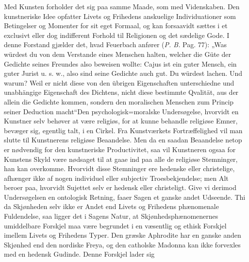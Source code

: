 \documentclass[12pt]{book}
\newcommand{\opage}[1]{\marginnote{\footnotesize\textit{[#1]}}}
\begin{document}
Med Kunsten forholder det sig paa samme Maade, som med Videnskaben. Den
kunstneriske Idee opfatter Livets og Frihedens anskuelige Individuationer som
Betingelser og Momenter for sit eget Formaal, og kan forsaavidt sættes i et
\opage{266} exclusivt eller dog indifferent Forhold til Religionen og det sædelige Gode. I denne
Forstand gjælder det, hvad Feuerbach anfører (\textit{P. B.} Pag. 77): „Was würdest
du von dem Verstande eines Menschen halten, welcher die Güte der Gedichte seines
Freundes also beweisen wollte: Cajus ist ein guter Mensch, ein guter Jurist u. s. w.,
also sind seine Gedichte auch gut. Du würdest lachen. Und warum? Weil er nicht diese
von den übrigen Eigenschaften unterschiedne und unabhängige Eigenschaft des
Dichtens, nicht diese bestimmte Qvalität, aus der allein die Gedichte kommen, sondern
den moralischen Menschen zum Princip seiner Deduction macht“\quad Den
psychologisk=moralske Undersøgelse, hvorvidt en Kunstner selv behøver at være
religiøs, for at kunne behandle religiøse Emner, bevæger sig, egentlig talt, i en
Cirkel. Fra Kunstværkets Fortræffelighed vil man slutte til Kunstnerens religiøse
Beaandelse. Men da en saadan Beaandelse netop er nødvendig for den kunstneriske
Productivitet, saa vil Kunstneren ogsaa for Kunstens Skyld være nødsaget til at gaae
ind paa alle de religiøse Stemninger, han kan overkomme. Hvorvidt disse Stemninger
ere hedenske eller christelige, afhænger ikke af nogen individuel eller subjectiv
Troesbekjendelse; men Alt beroer paa, hvorvidt Sujettet selv er hedensk eller
christeligt. Give vi derimod Undersøgelsen en ontologisk Retning, faaer Sagen et
ganske andet Udseende. Thi da Skjønheden selv ikke er Andet end Livets og Frihedens
phænomenale Fuldendelse, saa ligger det i Sagens Natur, at
Skjønhedsphænomenernes umiddelbare Forskjel maa være begrundet i en væsentlig og
ethisk Forskjel imellem Livets og Frihedens Typer. Den græske Aphrodite har en
ganske anden Skjønhed end den nordiske Freya, og den catholske Madonna kan ikke
forvexles med en hedensk Gudinde. Denne Forskjel lader sig
\end{document}
